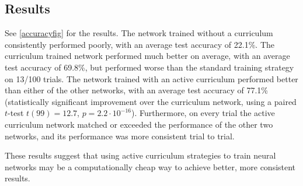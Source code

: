 \documentclass{article}
\begin{document}
\subsection{Results}
See \ref{accuracyfig} for the results. The network trained without a curriculum consistently performed poorly, with an average test accuracy of 22.1\%. The curriculum trained network performed much better on average, with an average test accuracy of 69.8\%, but performed worse than the standard training strategy on 13/100 trials. The network trained with an active curriculum performed better than either of the other networks, with an average test accuracy of 77.1\% (statistically significant improvement over the curriculum network, using a paired $t$-test $t(99) = 12.7$, $p = 2.2\cdot 10^{-16}$). Furthermore, on every trial the active curriculum network matched or exceeded the performance of the other two networks, and its performance was more consistent trial to trial.\par
These results suggest that using active curriculum strategies to train neural networks may be a computationally cheap way to achieve better, more consistent results. 
{\small

}
\end{document}

